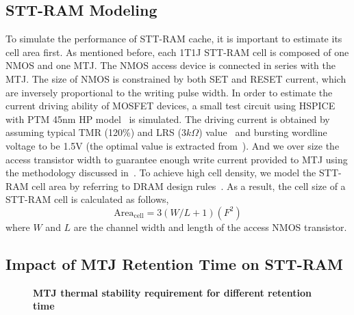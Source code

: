 \subsection{STT-RAM Modeling}
To simulate the performance of STT-RAM cache, it is important to estimate its cell area first. As mentioned before, each 1T1J STT-RAM cell is composed of one NMOS and one MTJ. The NMOS access device is connected in series with the MTJ. The size of NMOS is constrained by both SET and RESET current, which are inversely proportional to the writing pulse width. In order to estimate the current driving ability of MOSFET devices, a small test circuit using HSPICE with PTM 45nm HP model~\cite{PTM} is simulated. The driving current is obtained by assuming typical TMR (120\%) and LRS ($3k\Omega$) value~\cite{STTRAM:Qualcomm09} and bursting wordline voltage to be 1.5V (the optimal value is extracted from~\cite{STTRAM:Gatech10}). And we over size the access transistor width to guarantee enough write current provided to MTJ using the methodology discussed in~\cite{STTRAM:RPI10}. To achieve high cell density, we model the STT-RAM cell area by referring to DRAM design rules~\cite{DRAM:6F2}.  As a result, the cell size of a STT-RAM cell is calculated as follows,
\begin{equation}
\mathrm{Area}_{\mathrm{cell}}={3\left(W/L+1\right)}(F^2)
\end{equation}
where $W$ and $L$ are the channel width and length of the access NMOS transistor.

\subsection{Impact of MTJ Retention Time on STT-RAM} \label{subsec:retention}
\begin{wrapfigure}{l}{0.50\textwidth}
\centering
  \caption{\label{fig:retention} \scriptsize \bf MTJ thermal stability requirement for different retention time}
\end{wrapfigure}

